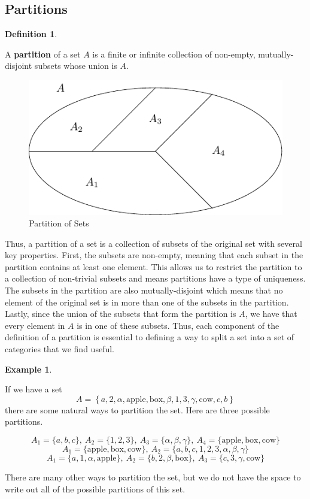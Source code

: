 \documentclass[
]{book}
\theoremstyle{definition}
\newtheorem{definition}{Definition}[chapter]
\theoremstyle{definition}
\newtheorem{example}{Example}[chapter]
\theoremstyle{definition}
\theoremstyle{definition}
\theoremstyle{remark}
\begin{document}
\hypertarget{partitions}{%
\subsection{Partitions}\label{partitions}}

\begin{definition}
\protect\hypertarget{def:partition}{}\label{def:partition}

A \textbf{partition} of a set \(A\) is a finite or infinite collection of non-empty, mutually-disjoint subsets whose union is \(A\).

\end{definition}

\begin{figure}

{\centering \includegraphics[width=0.5\linewidth]{tikz/Set_partition} 

}

\caption{Partition of Sets}\label{fig:unnamed-chunk-11}
\end{figure}

Thus, a partition of a set is a collection of subsets of the original set with several key properties. First, the subsets are non-empty, meaning that each subset in the partition contains at least one element. This allows us to restrict the partition to a collection of non-trivial subsets and means partitions have a type of uniqueness. The subsets in the partition are also mutually-disjoint which means that no element of the original set is in more than one of the subsets in the partition. Lastly, since the union of the subsets that form the partition is \(A\), we have that every element in \(A\) is in one of these subsets. Thus, each component of the definition of a partition is essential to defining a way to split a set into a set of categories that we find useful.

\begin{example}
\protect\hypertarget{exm:unlabeled-div-21}{}\label{exm:unlabeled-div-21}

If we have a set
\[A=\left\{ a, 2, \alpha , \mbox{apple} , \mbox{box}, \beta, 1, 3, \gamma , \mbox{cow}, c, b \right\}\] there are some natural ways to partition the set. Here are three possible partitions.

\[A_1 = \{a,b,c\}, \: A_2 = \{1,2,3\},\: A_3 = \{\alpha, \beta, \gamma\}, \: A_4 = \{\mbox{apple} , \mbox{box}, \mbox{cow}\}\]
\[A_1 = \{\mbox{apple} , \mbox{box}, \mbox{cow}\}, \: A_2 = \{a,b,c,1,2,3,\alpha,\beta,\gamma\}\]
\[A_1 = \{a,1,\alpha,\mbox{apple}\}, \: A_2 = \{b,2,\beta,\mbox{box}\}, \: A_3 = \{c,3,\gamma, \mbox{cow} \}\]

There are many other ways to partition the set, but we do not have the space to write out all of the possible partitions of this set.

\end{example}
\end{document}
